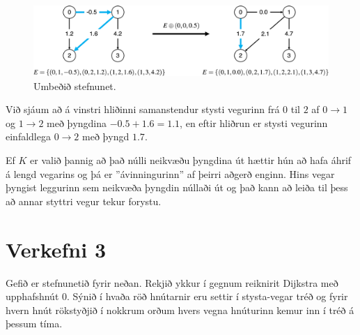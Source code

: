\documentclass[12pt, a4paper, hidelinks]{article}
\begin{document}
\begin{figure}[H]
    \centering
    \includegraphics[width=\textwidth]{HD11/pdf/img/V2-soln.png}
    \caption{Umbeðið stefnunet.}
    \label{fig:V2-soln}
\end{figure}
\noindent
Við sjáum að á vinstri hliðinni samanstendur stysti vegurinn frá $0$ til $2$ af $0 \to 1$ og
$1 \to 2$ með þyngdina $-0.5 + 1.6 = 1.1$, en eftir hliðrun er stysti vegurinn einfaldlega $0 \to 2$ með þyngd $1.7$.

Ef $K$ er valið þannig að það núlli neikvæðu þyngdina út hættir hún að hafa áhrif á lengd vegarins og þá er ''ávinningurinn'' af þeirri aðgerð enginn. Hins vegar þyngist leggurinn sem neikvæða þyngdin núllaði út og það kann að leiða til þess að annar styttri vegur tekur forystu.

\newpage

\section*{Verkefni 3}
Gefið er stefnunetið fyrir neðan. Rekjið ykkur í gegnum reiknirit Dijkstra með upphafshnút 0. Sýnið í hvaða röð hnútarnir eru settir í stysta-vegar tréð og fyrir hvern hnút rökstyðjið í nokkrum orðum hvers vegna hnúturinn kemur inn í tréð á þessum tíma.
\end{document}
